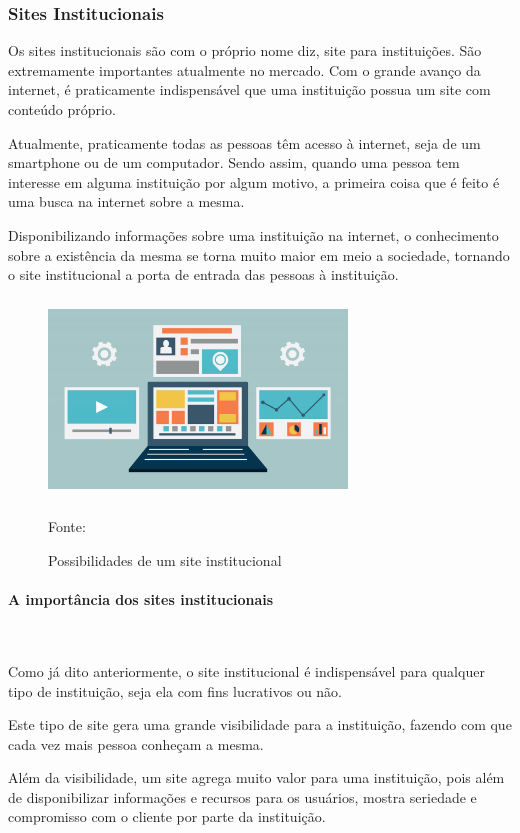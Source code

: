 \subsubsection{Sites Institucionais}
Os sites institucionais são com o próprio nome diz, site para instituições. São extremamente importantes atualmente no mercado. Com o grande avanço da internet, é praticamente indispensável que uma instituição possua um site com conteúdo próprio.

Atualmente, praticamente todas as pessoas têm acesso à internet, seja de um smartphone ou de um computador. Sendo assim, quando uma pessoa tem interesse em alguma instituição por algum motivo, a primeira coisa que é feito é uma busca na internet sobre a mesma.

Disponibilizando informações sobre uma instituição na internet, o conhecimento sobre a existência da mesma se torna muito maior em meio a sociedade, tornando o site institucional a porta de entrada das pessoas à instituição.


 \begin{figure}[!h]
	\centering
	\caption{Possibilidades de um site institucional }
	\includegraphics[width=300px, height=200px]{./images/2-4.jpg}
	\par{Fonte: \cite{markeninja}}
\end{figure}

\paragraph{A importância dos sites institucionais}\mbox{}\\
\par
Como já dito anteriormente, o site institucional é indispensável para qualquer tipo de instituição, seja ela com fins lucrativos ou não.

Este tipo de site gera uma grande visibilidade para a instituição, fazendo com que cada vez mais pessoa conheçam a mesma.

Além da visibilidade, um site agrega muito valor para uma instituição, pois além de disponibilizar informações e recursos para os usuários, mostra seriedade e compromisso com o cliente por parte da instituição.

